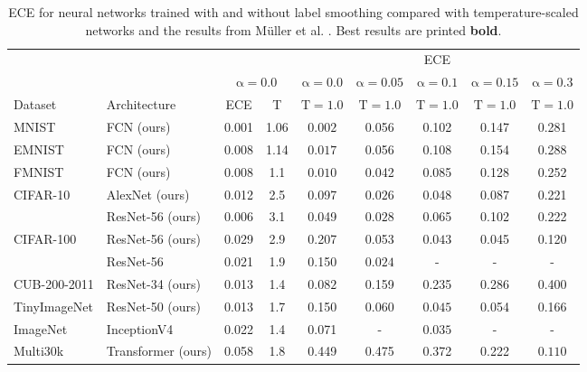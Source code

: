 \begin{table}
    \centering
    \caption{ECE for neural networks trained with and without label smoothing compared with temperature-scaled networks and the results from Müller et al. \cite{mueller2019}. Best results are printed \textbf{bold}.}
    \footnotesize
    \renewcommand{\arraystretch}{1.4}
    \setlength{\tabcolsep}{3pt}
    \begin{tabular}{|l|l|cc|ccccc|}
        \hline
        & & \multicolumn{2}{c|}{} & \multicolumn{5}{c|}{\sc ECE} \\
        \cline{3-9}
        & & \multicolumn{2}{c|}{$\mathrm{\alpha=0.0}$} & $\mathrm{\alpha=0.0}$ & $\mathrm{\alpha=0.05}$ & $\mathrm{\alpha=0.1}$ &$\mathrm{\alpha=0.15}$ & $\mathrm{\alpha=0.3}$\\  
        \cline{3-9}
        \sc Dataset & \sc Architecture & ECE & T & $\mathrm{T=1.0}$ & $\mathrm{T=1.0}$ & $\mathrm{T=1.0}$ & $\mathrm{T=1.0}$ & $\mathrm{T=1.0}$\\
        \hline
        MNIST & \sc FCN (ours) & 0.001 & 1.06 & $0.002$ & 0.056 & 0.102 & 0.147 & 0.281\\
        EMNIST & \sc FCN (ours) & 0.008 & 1.14 & $0.017$ & 0.056 & 0.108 & 0.154 & 0.288\\
        FMNIST & \sc FCN (ours) & 0.008 & 1.1 & $0.010$ & 0.042 & 0.085 & 0.128 & 0.252\\
        \hline
        \multirow{2}{*}{CIFAR-10} & \sc AlexNet (ours)& 0.012 & 2.5 & 0.097 & $0.026$ & 0.048 & 0.087 & 0.221\\
        & \sc ResNet-56 (ours) & 0.006 & 3.1& 0.049 & $0.028$ & 0.065 & 0.102 & 0.222\\
        \hline
        \multirow{2}{*}{CIFAR-100} & \sc ResNet-56 (ours)& 0.029 & 2.9 & 0.207 & 0.053 & $0.043$ & 0.045 & 0.120\\
        & \sc ResNet-56 \cite{mueller2019}& 0.021 & 1.9 & 0.150 & $0.024$ & - & - & -\\
        \hline
        CUB-200-2011 & \sc ResNet-34 (ours)& 0.013 & 1.4 & $0.082$ & 0.159 & 0.235 & 0.286 & 0.400\\
        \hline
        TinyImageNet & \sc ResNet-50 (ours)& 0.013 & 1.7 & 0.150 & 0.060 & $0.045$ & 0.054 & 0.166\\
        \hline
        ImageNet & \sc InceptionV4 \cite{mueller2019}& 0.022 & 1.4 & 0.071 & - & $0.035$ & - & -\\
        \hline
        Multi30k & \sc Transformer (ours) & 0.058 & 1.8 & 0.449 & 0.475 & 0.372 & 0.222 & $0.110$ \\
        \hline
    \end{tabular}
    \label{tab:ece}
\end{table}

